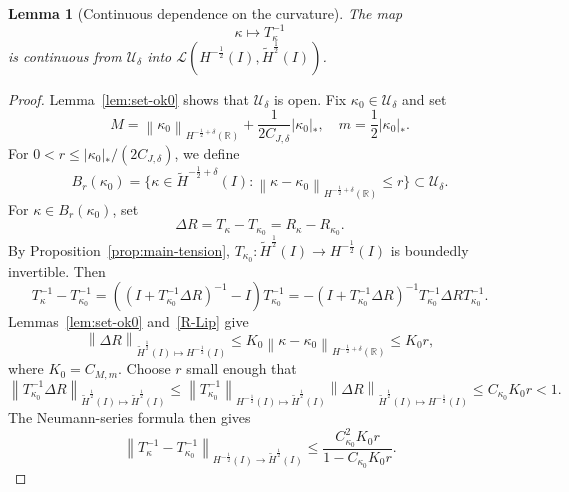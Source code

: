 \documentclass[11pt,reqno]{amsart}
\theoremstyle{plain}
\newtheorem{lemma}[theorem]{Lemma}
\theoremstyle{definition}
\numberwithin{equation}{section}
\newcommand{\paren}[1]{\left(#1\right)}
\newcommand{\mc}[1]{\mathcal{#1}}
\newcommand{\wt}[1]{\widetilde{#1}}
\newcommand{\abs}[1]{\left\lvert #1 \right\rvert}
\newcommand{\norm}[1]{\left\lVert #1 \right\rVert}
\newcommand{\R}{\mathbb{R}}
\newcommand{\hi}[1]{H^{#1}(I)}
\newcommand{\thi}[1]{\wt H^{#1}(I)}
\newcommand{\hr}[1]{H^{#1}(\R)}
\begin{document}
\begin{lemma}[Continuous dependence on the curvature]
\label{lem:inv-op-cont}
The map
\begin{equation}
    \kappa\longmapsto
    T_\kappa^{-1}
\end{equation}
is continuous from $\mc U_\delta$ into
$\mc L(\hi{-\frac{1}{2}},\thi{\frac{1}{2}})$.
\end{lemma}
\begin{proof}
Lemma~\ref{lem:set-ok0} shows that $\mc U_\delta$ is open. Fix
$\kappa_0\in\mc U_\delta$ and set
\begin{equation}
    M
    =\norm{\kappa_0}_{\hr{-\frac{1}{2}+\delta}}
    +\frac{1}{2C_{J,\delta}}\abs{\kappa_0}_*,
    \quad
    m = \frac{1}{2}\abs{\kappa_0}_*.
\end{equation}
For $0<r\le \abs{\kappa_0}_*/(2C_{J,\delta})$, we define
\begin{equation}
    B_r(\kappa_0) = \{\kappa\in\thi{-\frac{1}{2}+\delta}:\norm{\kappa-\kappa_0}_{\hr{-\frac{1}{2}+\delta}}\le r\}\subset\mc U_\delta.
\end{equation}
For $\kappa\in B_r(\kappa_0)$, set
\begin{equation}
    \Delta R=T_\kappa-T_{\kappa_0}
    =R_\kappa-R_{\kappa_0}.
\end{equation}
By Proposition~\ref{prop:main-tension},
$T_{\kappa_0}:\thi{\frac{1}{2}}\to\hi{-\frac{1}{2}}$ is boundedly invertible.
Then
\begin{equation}
    T_\kappa^{-1}-T_{\kappa_0}^{-1} =\paren{\paren{I+T_{\kappa_0}^{-1}\Delta R}^{-1}-I} T_{\kappa_0}^{-1}
    =-\paren{I+T_{\kappa_0}^{-1}\Delta R}^{-1} T_{\kappa_0}^{-1}\Delta R T_{\kappa_0}^{-1}.
\end{equation}
Lemmas~\ref{lem:set-ok0} and~\ref{R-Lip} give
\begin{equation}
    \norm{\Delta R}_{\thi{\frac{1}{2}}\mapsto\hi{-\frac{1}{2}}}
    \le K_0\norm{\kappa-\kappa_0}_{\hr{-\frac{1}{2}+\delta}}
    \le K_0 r,
\end{equation}
where $K_0=C_{M,m}$. Choose $r$ small enough that
\begin{equation}
    \norm{T_{\kappa_0}^{-1}\Delta R}_{\thi{\frac{1}{2}}\mapsto\thi{\frac{1}{2}}} \le
    \norm{T_{\kappa_0}^{-1}}_{\hi{-\frac{1}{2}}\mapsto\thi{\frac{1}{2}}} \norm{\Delta R}_{\thi{\frac{1}{2}}\mapsto\hi{-\frac{1}{2}}} \le C_{\kappa_0}K_0 r < 1.
\end{equation}
The Neumann-series formula then gives
\begin{equation}
    \norm{T_\kappa^{-1}-T_{\kappa_0}^{-1}}_{\hi{-\frac{1}{2}}\to\thi{\frac{1}{2}}}
    \le \frac{C_{\kappa_0}^2K_0r}{1-C_{\kappa_0}K_0r}.
\end{equation}
\end{proof}
\end{document}
